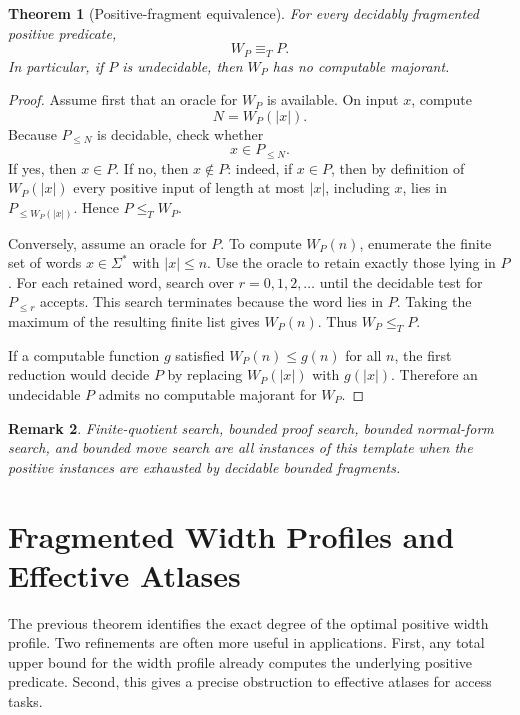\documentclass[11pt]{article}
\newtheorem{theorem}{Theorem}[section]
\newtheorem{remark}[theorem]{Remark}
\begin{document}
\begin{theorem}[Positive-fragment equivalence]
For every decidably fragmented positive predicate,
\[
W_P\equiv_T P.
\]
In particular, if \(P\) is undecidable, then \(W_P\) has no computable majorant.
\end{theorem}

\begin{proof}
Assume first that an oracle for \(W_P\) is available. On input \(x\), compute
\[
N=W_P(|x|).
\]
Because \(P_{\leq N}\) is decidable, check whether
\[
x\in P_{\leq N}.
\]
If yes, then \(x\in P\). If no, then \(x\notin P\): indeed, if \(x\in P\), then by definition of \(W_P(|x|)\) every positive input of length at most \(|x|\), including \(x\), lies in \(P_{\leq W_P(|x|)}\). Hence \(P\leq_T W_P\).

Conversely, assume an oracle for \(P\). To compute \(W_P(n)\), enumerate the finite set of words \(x\in\Sigma^\ast\) with \(|x|\leq n\). Use the oracle to retain exactly those lying in \(P\). For each retained word, search over \(r=0,1,2,\ldots\) until the decidable test for \(P_{\leq r}\) accepts. This search terminates because the word lies in \(P\). Taking the maximum of the resulting finite list gives \(W_P(n)\). Thus \(W_P\leq_T P\).

If a computable function \(g\) satisfied \(W_P(n)\leq g(n)\) for all \(n\), the first reduction would decide \(P\) by replacing \(W_P(|x|)\) with \(g(|x|)\). Therefore an undecidable \(P\) admits no computable majorant for \(W_P\).
\end{proof}

\begin{remark}
Finite-quotient search, bounded proof search, bounded normal-form search, and bounded move search are all instances of this template when the positive instances are exhausted by decidable bounded fragments.
\end{remark}

\section{Fragmented Width Profiles and Effective Atlases}

The previous theorem identifies the exact degree of the optimal positive width profile. Two refinements are often more useful in applications. First, any total upper bound for the width profile already computes the underlying positive predicate. Second, this gives a precise obstruction to effective atlases for access tasks.
\end{document}
